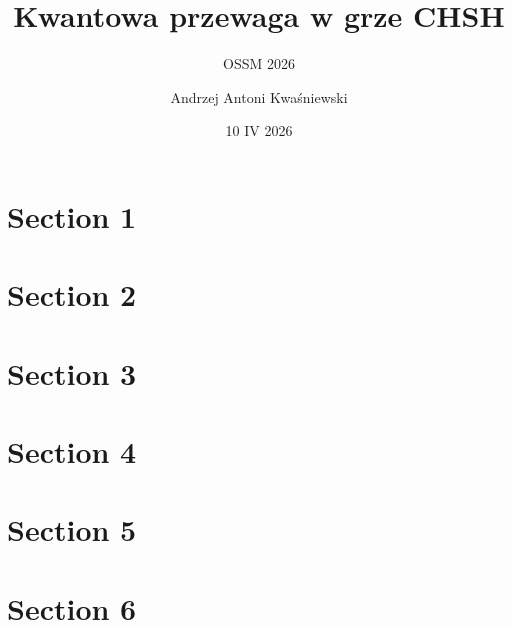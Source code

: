 \documentclass[aspectratio=169]{beamer}
\title[Title]{Kwantowa przewaga w grze CHSH}
\subtitle{OSSM 2026}
\author{Andrzej Antoni Kwaśniewski}
\date[]{10 IV 2026}
\begin{document}
\onehalfspacing

\mysimplefootline
\frame{\titlepage}

\section{Section 1}


\section{Section 2}



\section{Section 3}



\section{Section 4}


\section{Section 5}


\section{Section 6}


\end{document}

